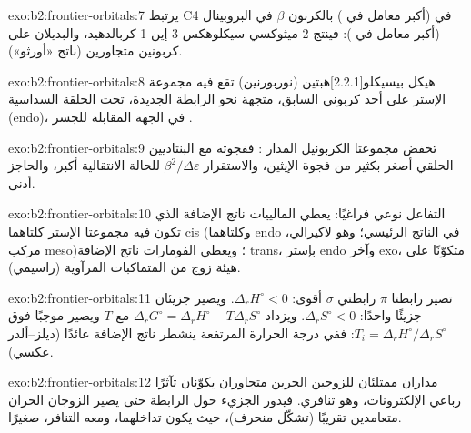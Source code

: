 \begin{solution}{exo:b2:frontier-orbitals:7}
يرتبط C4 في  (أكبر معامل في ) بالكربون $\beta$ في البروبينال (أكبر
معامل في ): فينتج 2-ميثوكسي سيكلوهكس-3-إين-1-كربالدهيد، والبديلان على
كربونين متجاورين (ناتج «أورثو»).
\end{solution}

\begin{solution}{exo:b2:frontier-orbitals:8}
هيكل بيسيكلو[2.2.1]هبتين (نوربورنين) تقع فيه مجموعة الإستر على أحد كربوني
 السابق، متجهة نحو الرابطة  الجديدة، تحت الحلقة السداسية
(endo)، في الجهة المقابلة للجسر .
\end{solution}

\begin{solution}{exo:b2:frontier-orbitals:9}
تخفض مجموعتا الكربونيل المدار  : ففجوته مع 
البنتاديين الحلقي أصغر بكثير من فجوة الإيثين، والاستقرار $\beta^2/\Delta\varepsilon$
للحالة الانتقالية أكبر، والحاجز أدنى.
\end{solution}

\begin{solution}{exo:b2:frontier-orbitals:10}
التفاعل نوعي فراغيًا: يعطي المالييات ناتج الإضافة الذي تكون فيه مجموعتا الإستر كلتاهما cis
(وكلتاهما endo في الناتج الرئيسي؛ وهو لاكيرالي، مركب meso)؛ ويعطي الفومارات ناتج الإضافة
trans، بإستر endo وآخر exo، متكوّنًا على هيئة زوج من المتماكبات المرآوية (راسيمي).
\end{solution}

\begin{solution}{exo:b2:frontier-orbitals:11}
تصير رابطتا $\pi$ رابطتي $\sigma$ أقوى: $\Delta_r H^\circ < 0$. ويصير جزيئان جزيئًا واحدًا:
$\Delta_r S^\circ < 0$. ويزداد $\Delta_r G^\circ = \Delta_r H^\circ - T\Delta_r S^\circ$ مع $T$ ويصير
موجبًا فوق $T_i = \Delta_r H^\circ/\Delta_r S^\circ$: ففي درجة الحرارة المرتفعة ينشطر ناتج الإضافة عائدًا
(ديلز--ألدر عكسي).
\end{solution}

\begin{solution}{exo:b2:frontier-orbitals:12}
مداران ممتلئان للزوجين الحرين متجاوران يكوّنان تآثرًا رباعي الإلكترونات،
وهو تنافري. فيدور الجزيء حول الرابطة  حتى يصير الزوجان الحران متعامدين
تقريبًا (تشكّل منحرف)، حيث يكون تداخلهما، ومعه التنافر،
صغيرًا.
\end{solution}


